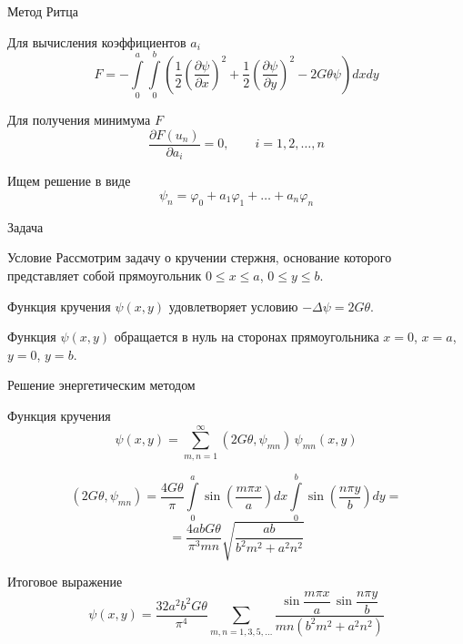 \documentclass[ignoreonframetext,unicode]{beamer}
\begin{document}
\begin{frame}{Метод Ритца}
		
	\begin{block}{Для вычисления коэффициентов $a_i$}	
		\[
		F = - \int\limits_0^a \int\limits_0^b \left(
		\frac{1}{2}
		\left(\frac{\partial\psi}{\partial x}\right)^2 + 
		\frac{1}{2}
		\left(\frac{\partial\psi}{\partial y}\right)^2
		-2G\theta\psi
		\right) dx dy
		\]
	\end{block}

\begin{block}{Для получения минимума $F$}
	\[
		\frac{\partial F(u_n)}{\partial a_i} = 0, \qquad i = 1, 2, \ldots, n
	\]
\end{block}

\begin{block}{Ищем решение в виде}	
	\[
	\psi_n = \varphi_0 + a_1 \varphi_1 + \ldots + a_n \varphi_n 
	\]
\end{block}
	
\end{frame}	

\begin{frame}{Задача}
	
		\begin{block}{Условие}
		Рассмотрим задачу о кручении стержня, основание которого представляет собой   прямоугольник
		$0 \leqslant x \leqslant a$, $0 \leqslant y \leqslant b$.
	\end{block}
		\begin{block}{}
		Функция кручения $\psi(x, y)$ удовлетворяет условию $-\Delta \psi = 2 G \theta$.
	\end{block}
\begin{block}{}
		Функция $\psi(x, y)$ обращается в нуль на
		сторонах прямоугольника $x= 0$, $x = a$, $y = 0$, $y = b$.
		\end{block}
	
\end{frame}

\begin{frame}{Решение энергетическим методом}
	\begin{block}{Функция кручения}	
		\[
		\psi(x, y) = \sum_{m, n = 1}^\infty (2G \theta, \psi_{mn}) \, \psi_{mn}(x, y)
		\]
	\end{block}
		\begin{block}{}
	\[
	(2G \theta, \psi_{mn}) = \frac{4 G \theta}{\pi}\int\limits_0^a \sin\left(\frac{m \pi x}{a}\right) dx \int\limits_0^b
	\sin\left(\frac{n \pi y}{b}\right) dy = 
	\]
	\[
	= \frac{4abG\theta}{\pi^3 mn} \sqrt{\frac{ab}{b^2 m^2 + a^2 n^2}}
	\]
\end{block}
\begin{block}{Итоговое выражение}	
	\[
	\psi(x, y) = \frac{32 a^2 b^2 G\theta}{\pi^4} \!\!\! \sum_{m, n = 1, 3, 5, \ldots}
	\!\!\! \frac{\sin\dfrac{m\pi x}{a} \, \sin\dfrac{n\pi y}{b}}{mn(b^2 m^2 + a^2 n^2)}
	\]
\end{block}
\end{frame}
\end{document}
